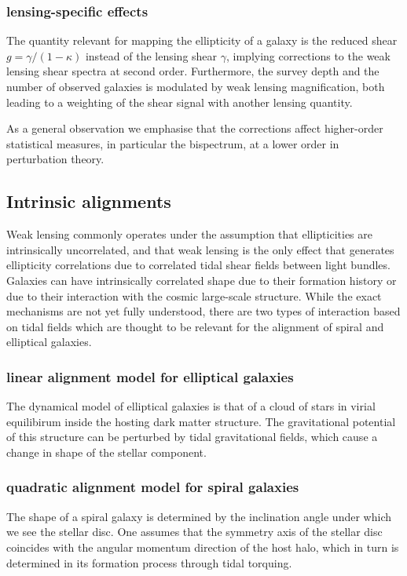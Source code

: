 \subsubsection{lensing-specific effects}
The quantity relevant for mapping the ellipticity of a galaxy is the reduced shear $g = \gamma/(1-\kappa)$ instead of the lensing shear $\gamma$, implying corrections to the weak lensing shear spectra at second order. Furthermore, the survey depth and the number of observed galaxies is modulated by weak lensing magnification, both leading to a weighting of the shear signal with another lensing quantity. 


As a general observation we emphasise that the corrections affect higher-order statistical measures, in particular the bispectrum, at a lower order in perturbation theory.


\subsection{Intrinsic alignments}
Weak lensing commonly operates under the assumption that ellipticities are intrinsically uncorrelated, and that weak lensing is the only effect that generates ellipticity correlations due to correlated tidal shear fields between light bundles. Galaxies can have intrinsically correlated shape due to their formation history or due to their interaction with the cosmic large-scale structure. While the exact mechanisms are not yet fully understood, there are two types of interaction based on tidal fields which are thought to be relevant for the alignment of spiral and elliptical galaxies.

\subsubsection{linear alignment model for elliptical galaxies}
The dynamical model of elliptical galaxies is that of a cloud of stars in virial equilibirum inside the hosting dark matter structure. The gravitational potential of this structure can be perturbed by tidal gravitational fields, which cause a change in shape of the stellar component. 


\subsubsection{quadratic alignment model for spiral galaxies}
The shape of a spiral galaxy is determined by the inclination angle under which we see the stellar disc. One assumes that the symmetry axis of the stellar disc coincides with the angular momentum direction of the host halo, which in turn is determined in its formation process through tidal torquing.



